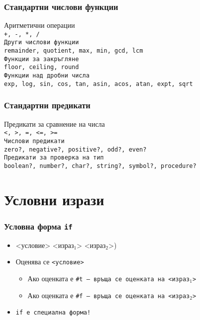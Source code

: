 \documentclass{beamer}
\begin{document}
\begin{frame}
  \frametitle{Стандартни числови функции}

  Аритметични операции\\
  \tt{+}, \tt{-}, \tt{*}, \tt{/}\\[1em]
  Други числови функции\\
  \tt{remainder}, \tt{quotient}, \tt{max}, \tt{min}, \tt{gcd}, \tt{lcm}\\[1em]
  Функции за закръгляне\\
  \tt{floor}, \tt{ceiling}, \tt{round}\\[1em]
  Функции над дробни числа\\
  \tt{exp}, \tt{log}, \tt{sin}, \tt{cos}, \tt{tan}, \tt{asin}, \tt{acos}, \tt{atan}, \tt{expt}, \tt{sqrt}
\end{frame}

\begin{frame}
  \frametitle{Стандартни предикати}

  Предикати за сравнение на числа\\
  \tt{<}, \tt{>}, \tt{=}, \tt{<=}, \tt{>=}\\[1em]
  Числови предикати\\
  \tt{zero?}, \tt{negative?}, \tt{positive?}, \tt{odd?}, \tt{even?}\\[1em]
  Предикати за проверка на тип\\
  \tt{boolean?}, \tt{number?}, \tt{char?}, \tt{string?}, \tt{symbol?}, \tt{procedure?}
\end{frame}

\section{Условни изрази}

\begin{frame}
  \frametitle{Условна форма \tt{if}}

  \begin{itemize}[<+->]
  \item {} <условие> <израз$_1$> <израз$_2$>\tta)
  \item Оценява се \tt{<условие>}
    \begin{itemize}
    \item Ако оценката е \tt{\#t} --- връща се оценката на <израз$_1$>
    \item Ако оценката е \tt{\#f} --- връща се оценката на <израз$_2$>
    \end{itemize}
  \item \alert{\tt{if} е специална форма!}
  \end{itemize}
\end{frame}
\end{document}
